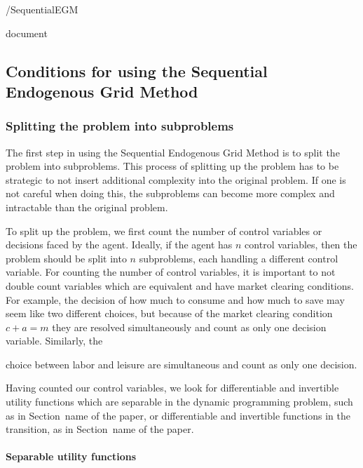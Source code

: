 \documentclass{article}
\title{}
\date{\displaydate{articleDate}}
\author{}
\newcommand{\aRat}{a}
\newcommand{\cRat}{c}
\newcommand{\mRat}{m}
\begin{document}
\maketitle
\keywords{}/SequentialEGM

document

\subsection{Conditions for using the Sequential Endogenous Grid Method}\label{sec:conditions}

\subsubsection{Splitting the problem into subproblems}\label{Splitting the problem into subproblems}

The first step in using the Sequential Endogenous Grid Method is to split the problem into subproblems. This process of splitting up the problem has to be strategic to not insert additional complexity into the original problem. If one is not careful when doing this, the subproblems can become more complex and intractable than the original problem.

To split up the problem, we first count the number of control variables or decisions faced by the agent. Ideally, if the agent has $n$ control variables, then the problem should be split into $n$ subproblems, each handling a different control variable. For counting the number of control variables, it is important to not double count variables which are equivalent and have market clearing conditions. For example, the decision of how much to consume and how much to save may seem like two different choices, but because of the market clearing condition $\cRat + \aRat = \mRat$ they are resolved simultaneously and count as only one decision variable. Similarly, the

choice between labor and leisure are simultaneous and count as only one decision.

Having counted our control variables, we look for differentiable and invertible utility functions which are separable in the dynamic programming problem, such as in Section~{name} of the paper, or differentiable and invertible functions in the transition, as in Section~{name} of the paper.

\paragraph{Separable utility functions}\label{Separable utility functions}
\end{document}
